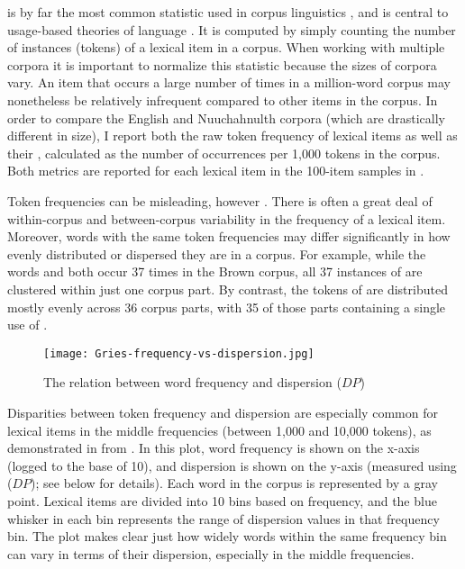  is by far the most common statistic used in corpus linguistics \parencite[403]{Gries2008}, and is central to usage-based theories of language \parencites{Bybee1985}{Tomasello2003}{Goldberg2006}{Bybee2007}{Bybee2010}{Diessel2019}. It is computed by simply counting the number of instances (tokens) of a lexical item in a corpus. When working with multiple corpora it is important to normalize this statistic because the sizes of corpora vary. An item that occurs a large number of times in a million-word corpus may nonetheless be relatively infrequent compared to other items in the corpus. In order to compare the English and Nuuchahnulth corpora (which are drastically different in size), I report both the raw token frequency of lexical items as well as their , calculated as the number of occurrences per 1,000 tokens in the corpus. Both metrics are reported for each lexical item in the 100-item samples in .

Token frequencies can be misleading, however \parencites{Gries2008}{Gries2021}{Griesfc}. There is often a great deal of within-corpus and between-corpus variability in the frequency of a lexical item. Moreover, words with the same token frequencies may differ significantly in how evenly distributed or dispersed they are in a corpus. For example, while the words  and  both occur 37 times in the Brown corpus, all 37 instances of  are clustered within just one corpus part. By contrast, the tokens of  are distributed mostly evenly across 36 corpus parts, with 35 of those parts containing a single use of  \parencite[100]{Gries2021}.

\begin{figure}
  \texttt{[image: Gries-frequency-vs-dispersion.jpg]}
  \caption[The relation between word frequency and dispersion (DP)]{The relation between word frequency and dispersion ($DP$) }
  \label{fig:Gries-frequency-vs-dispersion}
\end{figure}

Disparities between token frequency and dispersion are especially common for lexical items in the middle frequencies (between 1,000 and 10,000 tokens), as demonstrated in  from \textcite[112]{Gries2021}. In this plot, word frequency is shown on the x-axis (logged to the base of 10), and dispersion is shown on the y-axis (measured using  ($DP$); see below for details). Each word in the corpus is represented by a gray point. Lexical items are divided into 10 bins based on frequency, and the blue whisker in each bin represents the range of dispersion values in that frequency bin. The plot makes clear just how widely words within the same frequency bin can vary in terms of their dispersion, especially in the middle frequencies.

